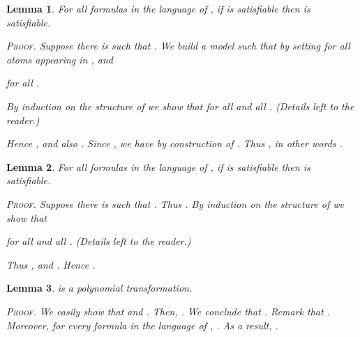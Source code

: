 \documentclass{article}
\newtheorem{lemma}{Lemma}
\newenvironment{pf}{\em \medskip\noindent \textsc{Proof.}}
{\hspace*{\fill}\nolinebreak[2]\hspace*{\fill}\medskip}
\begin{document}
\begin{lemma}\label{lem:dsat2trcsat}
For all formulas  in the language of \DSTIT,
if    is satisfiable
then  is satisfiable.

\begin{pf}
Suppose there is  such that  .
We build a model  such that 
by setting
 for all atoms  appearing in , and

for all .

By induction on the structure of  we show that 
for all  and all .
(Details left to the reader.)

Hence , and also
      .
Since , we have  by construction of .
Thus  ,
in other words
      .
\end{pf}
\end{lemma}

\begin{lemma}\label{lem:trdsat2csat}
For all formulas  in the language of \DSTIT,
if    is satisfiable
then  is satisfiable.

\begin{pf}
Suppose there is 
such that  . Thus
.
By induction on the structure of  we show that

for all  and all .
(Details left to the reader.)

Thus  , and .
Hence .
\end{pf}
\end{lemma}


\begin{lemma}
 is a polynomial transformation.

\begin{pf}
We easily show that  and
.
Then, .
We conclude that .
Remark that .
Moreover, for every formula  in the language of \CSTIT,
.
As a result,
.

\end{pf}
\end{lemma}
\end{document}
